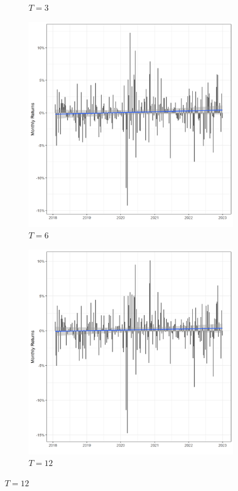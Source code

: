 \begin{figure}
\begin{subfigure}[b]{0.49\textwidth}
         \caption{$T = 3$}
         \label{fig:three sin x}
     \end{subfigure}
     \hfill
     \begin{subfigure}[b]{0.49\textwidth}
         \centering
         \includegraphics[width=\textwidth]{Projekt/1.Figures analysis/LT_negative_returns_6.png}
         \caption{$T = 6$}
         \label{fig:five over x}
     \end{subfigure}
     \hfill
     \begin{subfigure}[b]{0.49\textwidth}
         \centering
         \includegraphics[width=\textwidth]{Projekt/1.Figures analysis/LT_negative_returns_12.png}
         \caption{$T = 12$}
         \label{fig:five over x}
     \end{subfigure}
        \label{fig:three graphs}
\end{figure}




